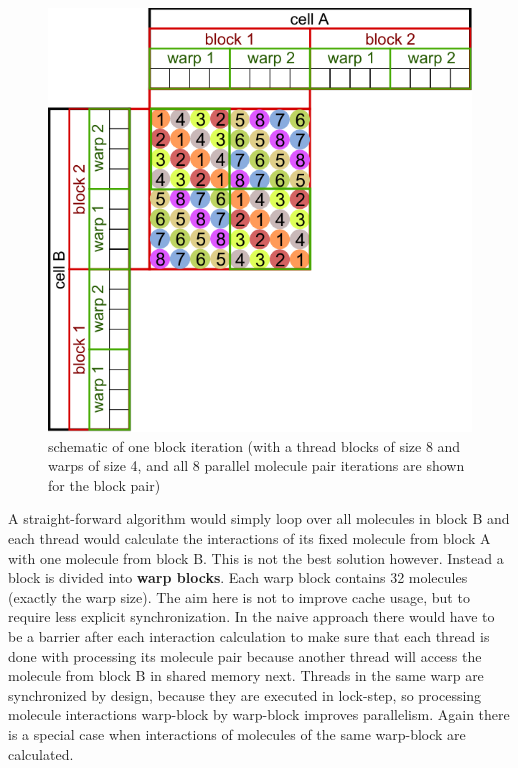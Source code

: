 \begin{figure}
\centering
\includegraphics{figures/cellprocessor_block_iteration_1.pdf}
\caption{schematic of one block iteration (with a thread blocks of size 8 and warps of size 4, and all 8 parallel molecule pair iterations are shown for the block pair)}
\end{figure}

A straight-forward algorithm would simply loop over all molecules in block B and each thread would calculate the interactions of its fixed molecule from block A with one molecule from block B.
This is not the best solution however. Instead a block is divided into \textbf{warp blocks}. Each warp block contains 32 molecules (exactly the warp size).
The aim here is not to improve cache usage, but to require less explicit synchronization.
In the naive approach there would have to be a barrier after each interaction calculation to make sure that each thread is done with processing its molecule pair because another thread will access the molecule from block B in shared memory next.
Threads in the same warp are synchronized by design, because they are executed in lock-step, so processing  molecule interactions warp-block by warp-block improves parallelism.
Again there is a special case when interactions of molecules of the same warp-block are calculated.

